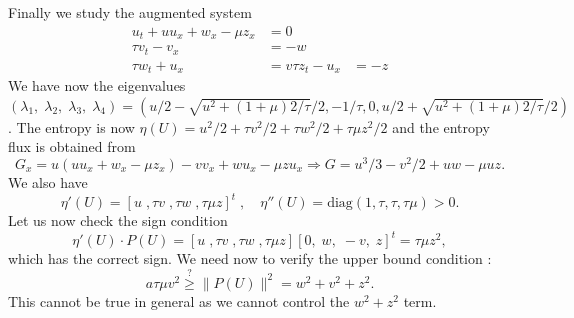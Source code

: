 \documentclass{article}
\theoremstyle{plain}
\theoremstyle{definition}
\numberwithin{theorem}{section}
\begin{document}
 

Finally we  study   the augmented system
\begin{subequations} \label{vkdvh3}
\begin{align}
    u_t +  u u_x  + w_x -\mu z_x & = 0 \\
    \tau v_t - v_x & = -w\\
        \tau w_t  + u_x  & = v
            \tau z_t - u_x & = -z 
\end{align}
\end{subequations}
We have now the eigenvalues $(\lambda_1,\;\lambda_2,\;\lambda_3,\;\lambda_4)=(u/2 - \sqrt{u^2+(1+\mu)2/\tau}/2, -1/\tau, 0 , u/2 + \sqrt{u^2+(1+\mu)2/\tau}/2)$.
The entropy is now $\eta(U) =u^2/2 + \tau v^2/2 + \tau w^2/2 +\tau  \mu  z^2/2$ and the entropy flux is obtained from
$$
G_x = u( u u_x  + w_x -\mu z_x) - vv_x +wu_x -\mu z u_x  \Rightarrow  G =u^3/3  -v^2/2 + uw -\mu uz.
$$
We also have 
$$
\eta'(U)= [u\;, \tau v\;, \tau w\;, \tau\mu z]^t\;,\quad 
\eta''(U) =  \text{diag}(1,\tau,\tau,\tau \mu) >0.
$$
Let us now check the  sign  condition
$$
\eta'(U)\cdot P(U) = [u\;, \tau v\;, \tau w\;, \tau\mu z] [ 0,\; w,\; -v,\; z ]^t = \tau \mu z^2 ,
$$
which has the correct sign. We need now to verify the upper bound  condition :
$$
  a \tau \mu   v^2 \stackrel{?}{\ge} \|P(U)\|^2 = w^2 + v^2 + z^2 .
$$
This cannot be true in general as we cannot control the $w^2 + z^2$ term.

%
%
%
\end{document}
